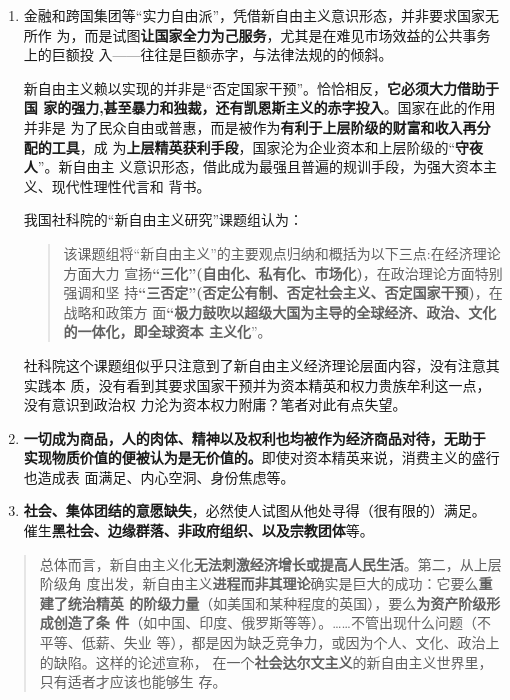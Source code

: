 \begin{enumerate}
\item 金融和跨国集团等“实力自由派”，凭借新自由主义意识形态，并非要求国家无所作
  为，而是试图\textbf{让国家全力为己服务}，尤其是在难见市场效益的公共事务上的巨额投
  入——往往是巨额赤字，与法律法规的的倾斜。

  新自由主义赖以实现的并非是“否定国家干预”。恰恰相反，\textbf{它必须大力借助于国
    家的强力,甚至暴力和独裁，还有凯恩斯主义的赤字投入}。国家在此的作用并非是
  为了民众自由或普惠，而是被作为\textbf{有利于上层阶级的财富和收入再分配的工具}，成
  为\textbf{上层精英获利手段}，国家沦为企业资本和上层阶级的“\textbf{守夜人}”。新自由主
  义意识形态，借此成为最强且普遍的规训手段，为强大资本主义、现代性理性代言和
  背书。

  我国社科院的“新自由主义研究”课题组认为：
  \begin{quotation}
    该课题组将“新自由主义”的主要观点归纳和概括为以下三点:在经济理论方面大力
    宣扬\textbf{“三化”(自由化、私有化、市场化)}，在政治理论方面特别强调和坚
    持\textbf{“三否定”(否定公有制、否定社会主义、否定国家干预)}，在战略和政策方
    面\textbf{“极力鼓吹以超级大国为主导的全球经济、政治、文化的一体化，即全球资本
      主义化}”。\cite{newneo}
  \end{quotation}
  社科院这个课题组似乎只注意到了新自由主义经济理论层面内容，没有注意其实践本
  质，没有看到其要求国家干预并为资本精英和权力贵族牟利这一点，没有意识到政治权
  力沦为资本权力附庸？笔者对此有点失望。

\item \textbf{一切成为商品，人的肉体、精神以及权利也均被作为经济商品对待，无助于
    实现物质价值的便被认为是无价值的。}即使对资本精英来说，消费主义的盛行也造成表
  面满足、内心空洞、身份焦虑等。\cite[179]{davidneoliber}

\item \textbf{社会、集体团结的意愿缺失}，必然使人试图从他处寻得（很有限的）满足。
  催生\textbf{黑社会、边缘群落、非政府组织、以及宗教团体}等。
\end{enumerate}

\begin{quotation}
  总体而言，新自由主义化\textbf{无法刺激经济增长或提高人民生活}。第二，从上层阶级角
  度出发，新自由主义\textbf{进程而非其理论}确实是巨大的成功：它要么\textbf{重建了统治精英
    的阶级力量}（如美国和某种程度的英国），要么\textbf{为资产阶级形成创造了条
    件}（如中国、印度、俄罗斯等等）。……不管出现什么问题（不平等、低薪、失业
  等），都是因为缺乏竞争力，或因为个人、文化、政治上的缺陷。这样的论述宣称，
  在一个\textbf{社会达尔文主义}的新自由主义世界里，只有适者才应该也能够生
  存。\cite[164]{davidneoliber}
\end{quotation}


